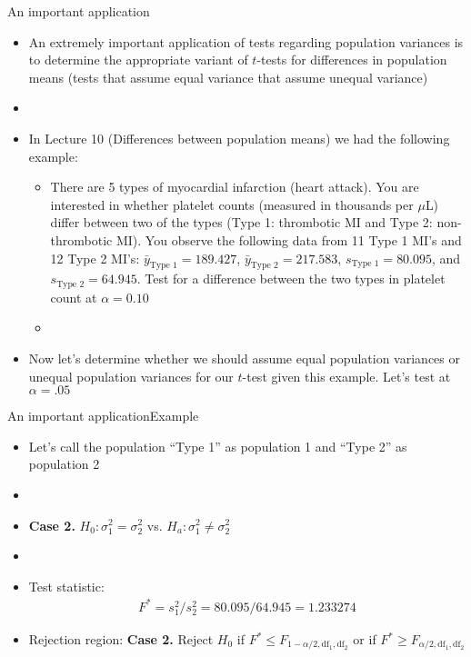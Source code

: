 \documentclass[xcolor=dvipsnames]{beamer}
\begin{document}
\begin{frame}{An important application}
	\begin{itemize}
		\item An extremely important application of tests regarding population variances is to determine the appropriate variant of $t$-tests for differences in population means (tests that assume equal variance that assume unequal variance)
		\item[]
		\item In Lecture 10 (Differences between population means) we had the following example: 
		\begin{itemize}
			\item {\tiny There are 5 types of myocardial infarction (heart attack). You are interested in whether platelet counts (measured in thousands per $\mu$L) differ between two of the types (Type 1: thrombotic MI and Type 2: non-thrombotic MI). You observe the following data from 11 Type 1 MI's and 12 Type 2 MI's: $\bar{y}_{\text{Type 1}}=189.427$, $\bar{y}_{\text{Type 2}}=217.583$, $s_{\text{Type 1}} = 80.095$, and $s_{\text{Type 2}} = 64.945$. Test for a difference between the two types in platelet count at $\alpha = 0.10$}
			\item[]
		\end{itemize}
	\item Now let's determine whether we should assume equal population variances or unequal population variances for our $t$-test given this example. Let's test at $\alpha = .05$
	\end{itemize}
\end{frame}

\begin{frame}{An important application}{Example}
	\begin{itemize}
		\item Let's call the population ``Type 1'' as population 1 and ``Type 2'' as population 2 \pause
		\item[]
		\item \textbf{Case 2.} $H_0: \sigma_1^2 = \sigma_2^2$ vs. $H_a: \sigma_1^2 \neq \sigma_2^2$ \pause
		\item[]
		\item Test statistic:
		\begin{gather*}
		F^* = s_1^2 /s_2^2 =  80.095 / 64.945 = 1.233274 
		\end{gather*}\pause
		\item Rejection region: \textbf{Case 2.} Reject $H_0$ if $F^* \leq F_{1-\alpha / 2, \text{df}_1,\text{df}_2}$ or if $F^* \geq F_{\alpha / 2, \text{df}_1,\text{df}_2} $
	\end{itemize}
\end{frame}
\end{document}
